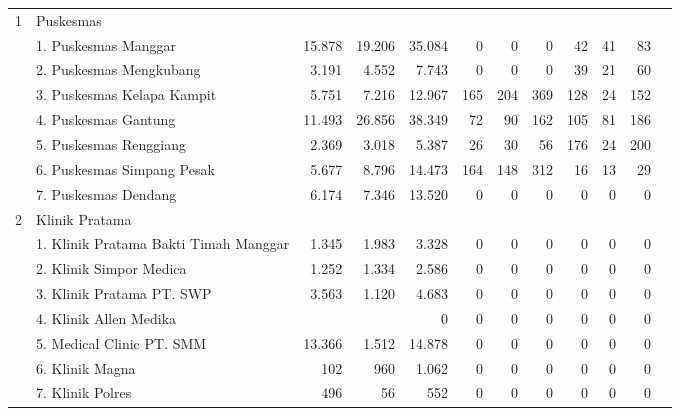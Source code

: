 {\begin{small}
\begin{tabular}{cY{30em}rrrrrrrrrr}
    1 & Puskesmas & & & & & & & & & \\
    & 1. Puskesmas Manggar                                 & 15.878 &  19.206 &  35.084 &      0 &      0 &     0 &    42 &    41 &    83 \\
    & 2. Puskesmas Mengkubang                              &  3.191 &   4.552 &   7.743 &      0 &      0 &     0 &    39 &    21 &    60 \\
    & 3. Puskesmas Kelapa Kampit                           &  5.751 &   7.216 &  12.967 &    165 &    204 &   369 &   128 &    24 &   152 \\
    & 4. Puskesmas Gantung                                 & 11.493 &  26.856 &  38.349 &     72 &     90 &   162 &   105 &    81 &   186 \\
    & 5. Puskesmas Renggiang                               &  2.369 &   3.018 &   5.387 &     26 &     30 &    56 &   176 &    24 &   200 \\
    & 6. Puskesmas Simpang Pesak                           &  5.677 &   8.796 &  14.473 &    164 &    148 &   312 &    16 &    13 &    29 \\
    & 7. Puskesmas Dendang                                 &  6.174 &   7.346 &  13.520 &      0 &      0 &     0 &     0 &     0 &     0 \\
    2 & Klinik Pratama & & & & & & & & & \\
    & 1. Klinik Pratama Bakti Timah Manggar                &  1.345 &   1.983 &   3.328 &      0 &      0 &     0 &     0 &     0 &     0 \\
	& 2. Klinik Simpor Medica                              &  1.252 &   1.334 &   2.586 &      0 &      0 &     0 &     0 &     0 &     0 \\
	& 3. Klinik Pratama PT. SWP                            &  3.563 &   1.120 &   4.683 &      0 &      0 &     0 &     0 &     0 &     0 \\
	& 4. Klinik Allen Medika                               &        &         &       0 &      0 &      0 &     0 &     0 &     0 &     0 \\
	& 5. Medical Clinic PT. SMM                            & 13.366 &   1.512 &  14.878 &      0 &      0 &     0 &     0 &     0 &     0 \\
	& 6. Klinik Magna                                      &    102 &     960 &   1.062 &      0 &      0 &     0 &     0 &     0 &     0 \\
	& 7. Klinik Polres                                     &    496 &      56 &     552 &      0 &      0 &     0 &     0 &     0 &     0 \\
    \end{tabular}%
    \end{small}

}

